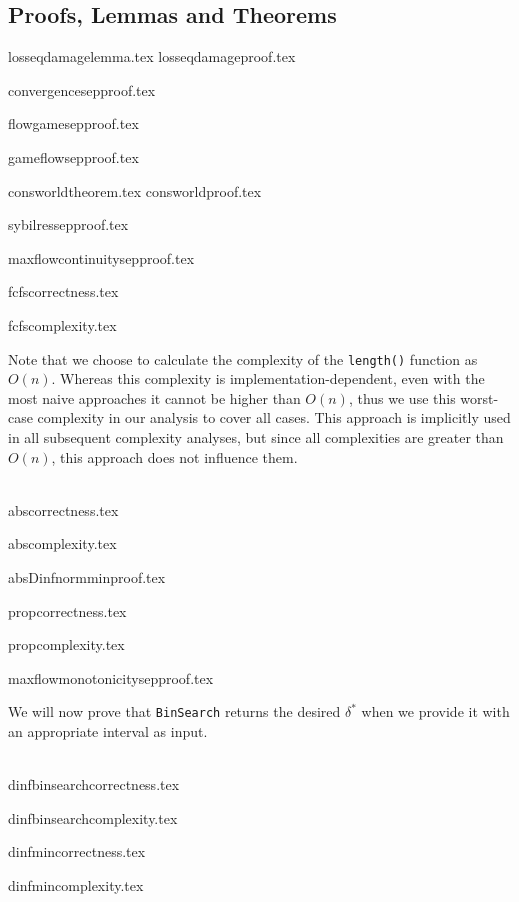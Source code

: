 \subsection{Proofs, Lemmas and Theorems}
  {losseqdamagelemma.tex}
  {losseqdamageproof.tex}

  {convergencesepproof.tex}

  {flowgamesepproof.tex}

  {gameflowsepproof.tex}

  {consworldtheorem.tex}
  {consworldproof.tex}

  {sybilressepproof.tex}

  {maxflowcontinuitysepproof.tex}

  {fcfscorrectness.tex}

  {fcfscomplexity.tex}

  Note that we choose to calculate the complexity of the \texttt{length()} function as $O\left(n\right)$. Whereas this
  complexity is implementation-dependent, even with the most naive approaches it cannot be higher than $O\left(n\right)$,
  thus we use this worst-case complexity in our analysis to cover all cases. This approach is implicitly used in all
  subsequent complexity analyses, but since all complexities are greater than $O\left(n\right)$, this approach does not
  influence them.

  \ \\

  {abscorrectness.tex}

  {abscomplexity.tex}

  {absDinfnormminproof.tex}

  {propcorrectness.tex}

  {propcomplexity.tex}

  {maxflowmonotonicitysepproof.tex}

  We will now prove that \texttt{BinSearch} returns the desired $\delta^*$ when we provide it with an appropriate interval as
  input.

  \ \\

  {dinfbinsearchcorrectness.tex}

  {dinfbinsearchcomplexity.tex}

  {dinfmincorrectness.tex}

  {dinfmincomplexity.tex}
